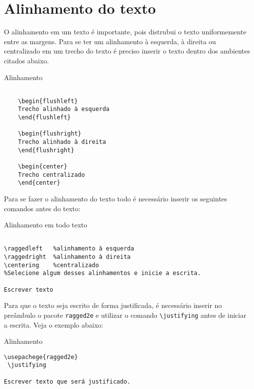 \section{Alinhamento do texto}
O alinhamento em um texto é importante, pois distrubui o texto uniformemente entre as margens. Para se ter um alinhamento à esquerda, à direita ou centralizado em um trecho do texto é preciso inserir o texto dentro dos ambientes citados abaixo.
\begin{trailer}{Alinhamento}
\begin{verbatim}

    \begin{flushleft}
    Trecho alinhado à esquerda
    \end{flushleft}

    \begin{flushright}
    Trecho alinhado à direita
    \end{flushright}

    \begin{center}
    Trecho centralizado
    \end{center}

\end{verbatim}
\end{trailer}

\noindent Para se fazer o alinhamento do texto todo é necessário inserir os seguintes comandos antes do texto:

\begin{trailer}{Alinhamento em todo texto}
\begin{verbatim}

\raggedleft   %alinhamento à esquerda
\raggedright  %alinhamento à direita
\centering    %centralizado
%Selecione algum desses alinhamentos e inicie a escrita.

Escrever texto

\end{verbatim}
\end{trailer}

\noindent Para que o texto seja escrito de forma justificada, é necessário inserir no preâmbulo o pacote \verb|ragged2e| e utilizar o comando \verb|\justifying| antes de iniciar 
a escrita. Veja o exemplo abaixo:

\begin{trailer}{Alinhamento}
\begin{verbatim}
\usepachege{ragged2e}
 \justifying 

Escrever texto que será justificado.


\end{verbatim}
\end{trailer}

